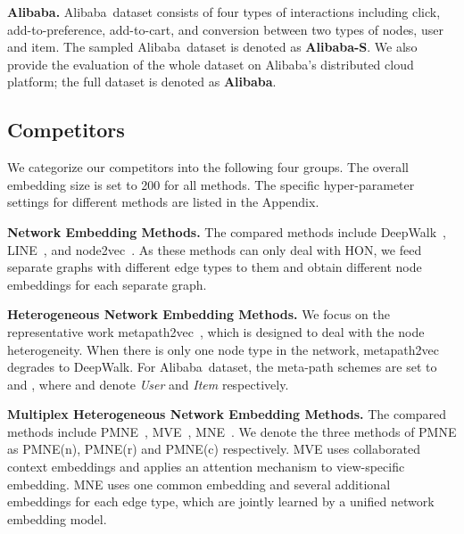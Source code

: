 \documentclass[sigconf]{acmart}
\newcommand{\company}{Alibaba}
\newcommand{\hide}[1]{} \newcommand{\jie}[1]{\textbf{\color{red}[(JT: #1 )]}}  \newcommand{\vpara}[1]{\vspace{0.07in}\noindent\textbf{#1 }}
\begin{document}
\vpara{\company.} \company\ dataset consists of four types of interactions including click, add-to-preference, add-to-cart, and conversion between two types of nodes, user and item. The sampled \company\ dataset is denoted as \textbf{\company-S}. We also provide the evaluation of the whole dataset on \company's distributed cloud platform; the full dataset is denoted as \textbf{\company}.
\subsection{Competitors}
We categorize our competitors into the following four groups. The overall embedding size is set to 200 for all methods. The specific hyper-parameter settings for different methods are listed in the Appendix. \hide{For random-walk based methods, the number of walks for each node is set to 20 and the length of walks is set to 10. The window size is set to 5 for generating node contexts. The number of negative samples is set to 5. The number of iterations for training skip-gram model is set to 10. The number of epochs is set to 5. The additional embedding size for MNE and the edge-specific embedding size for our model is 10. Model specific hyper-parameter settings for different methods are introduced below. }



\vpara{Network Embedding Methods.}
The compared methods include DeepWalk~\cite{perozzi2014deepwalk}, LINE~\cite{tang2015line}, and node2vec~\cite{grover2016node2vec}. As these methods can only deal with HON, we feed separate graphs with different edge types to them and obtain different node embeddings for each separate graph. 


\vpara{Heterogeneous Network Embedding Methods.}
We focus on the representative work  metapath2vec~\cite{dong2017metapath2vec}, which is designed to deal with the node heterogeneity. When there is only one node type in the network, metapath2vec degrades to DeepWalk. For \company\ dataset, the meta-path schemes are set to  and , where  and  denote \textit{User} and \textit{Item} respectively.



\vpara{Multiplex Heterogeneous Network Embedding Methods.}
The compared methods include PMNE~\cite{liu2017principled}, MVE~\cite{qu2017attention}, MNE~\cite{ijcai2018-428}. We denote the three methods of PMNE as PMNE(n), PMNE(r) and PMNE(c) respectively. MVE uses collaborated context embeddings and applies an attention mechanism to view-specific embedding. MNE uses one common embedding and several additional embeddings for each edge type, which are jointly learned by a unified network embedding model. \hide{We further examined the aggregated version of MNE, denoted as MNE-aggregate, which is basically MNE with the aggregator in section \ref{sec:trans} being added on top of it.}
\end{document}
